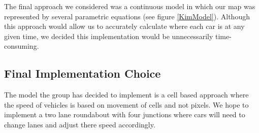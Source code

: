 \documentclass[11pt]{article}
\begin{document}
	The final approach we considered was a continuous model in which our map was represented by several parametric equations (see figure \ref{KimModel}). 
	Although this approach would allow us to accurately calculate where each car is at any given time, we decided this implementation would be unnecessarily time-consuming.  


\subsection{Final Implementation Choice}

	The model the group has decided to implement is a cell based approach where the speed of vehicles is based on movement of cells and not pixels.
	 We hope to implement a two lane roundabout with four junctions where cars will need to change lanes and adjust there speed accordingly.
	
\end{document}

